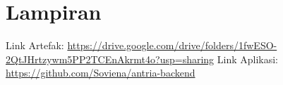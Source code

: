 \newpage




\section*{Lampiran}
\noindent
Link Artefak: \url{https://drive.google.com/drive/folders/1fwESO-2QtJHrtzywm5PP2TCEnAkrmt4o?usp=sharing}
\newline
Link Aplikasi: \url{https://github.com/Soviena/antria-backend}